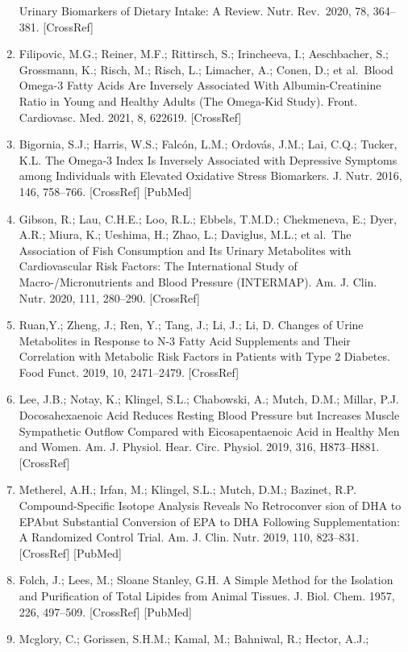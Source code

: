 \documentclass[journal=jacsat,manuscript=article]{achemso}
\begin{document}
\begin{enumerate}
  Urinary Biomarkers of Dietary Intake: A Review. Nutr. Rev.~2020, 78,
  364--381. {[}CrossRef{]}
\item
  Filipovic, M.G.; Reiner, M.F.; Rittirsch, S.; Irincheeva, I.;
  Aeschbacher, S.; Grossmann, K.; Risch, M.; Risch, L.; Limacher, A.;
  Conen, D.; et al.~Blood Omega-3 Fatty Acids Are Inversely Associated
  With Albumin-Creatinine Ratio in Young and Healthy Adults (The
  Omega-Kid Study). Front. Cardiovasc. Med. 2021, 8, 622619.
  {[}CrossRef{]}
\item
  Bigornia, S.J.; Harris, W.S.; Falcón, L.M.; Ordovás, J.M.; Lai, C.Q.;
  Tucker, K.L. The Omega-3 Index Is Inversely Associated with Depressive
  Symptoms among Individuals with Elevated Oxidative Stress Biomarkers.
  J. Nutr. 2016, 146, 758--766. {[}CrossRef{]} {[}PubMed{]}
\item
  Gibson, R.; Lau, C.H.E.; Loo, R.L.; Ebbels, T.M.D.; Chekmeneva, E.;
  Dyer, A.R.; Miura, K.; Ueshima, H.; Zhao, L.; Daviglus, M.L.; et
  al.~The Association of Fish Consumption and Its Urinary Metabolites
  with Cardiovascular Risk Factors: The International Study of
  Macro-/Micronutrients and Blood Pressure (INTERMAP). Am. J. Clin.
  Nutr. 2020, 111, 280--290. {[}CrossRef{]}
\item
  Ruan,Y.; Zheng, J.; Ren, Y.; Tang, J.; Li, J.; Li, D. Changes of Urine
  Metabolites in Response to N-3 Fatty Acid Supplements and Their
  Correlation with Metabolic Risk Factors in Patients with Type 2
  Diabetes. Food Funct. 2019, 10, 2471--2479. {[}CrossRef{]}
\item
  Lee, J.B.; Notay, K.; Klingel, S.L.; Chabowski, A.; Mutch, D.M.;
  Millar, P.J. Docosahexaenoic Acid Reduces Resting Blood Pressure but
  Increases Muscle Sympathetic Outflow Compared with Eicosapentaenoic
  Acid in Healthy Men and Women. Am. J. Physiol. Hear. Circ. Physiol.
  2019, 316, H873--H881. {[}CrossRef{]}
\item
  Metherel, A.H.; Irfan, M.; Klingel, S.L.; Mutch, D.M.; Bazinet, R.P.
  Compound-Specific Isotope Analysis Reveals No Retroconver sion of DHA
  to EPAbut Substantial Conversion of EPA to DHA Following
  Supplementation: A Randomized Control Trial. Am. J. Clin. Nutr. 2019,
  110, 823--831. {[}CrossRef{]} {[}PubMed{]}
\item
  Folch, J.; Lees, M.; Sloane Stanley, G.H. A Simple Method for the
  Isolation and Purification of Total Lipides from Animal Tissues. J.
  Biol. Chem. 1957, 226, 497--509. {[}CrossRef{]} {[}PubMed{]}
\item
  Mcglory, C.; Gorissen, S.H.M.; Kamal, M.; Bahniwal, R.; Hector, A.J.;

\end{enumerate}
\end{document}
